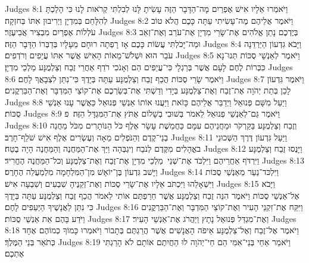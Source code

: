 Judges 8:1	וַיֹּאמְרוּ אֵלָיו אִישׁ אֶפְרַיִם מָה־הַדָּבָר הַזֶּה עָשִׂיתָ לָּנוּ לְבִלְתִּי קְרֹאות לָנוּ כִּי הָלַכְתָּ לְהִלָּחֵם בְּמִדְיָן וַיְרִיבוּן אִתּוֹ בְּחזְקָה׃
Judges 8:2	וַיֹּאמֶר אֲלֵיהֶם מֶה־עָשִׂיתִי עַתָּה כָּכֶם הֲלֹא טוֹב עֹלְלוֹת אֶפְרַיִם מִבְצִיר אֲבִיעֶזֶר׃
Judges 8:3	בְּיֶדְכֶם נָתַן אֱלֹהִים אֶת־שָׂרֵי מִדְיָן אֶת־עֹרֵב וְאֶת־זְאֵב וּמַה־יָּכֹלְתִּי עֲשׂוֹת כָּכֶם אָז רָפְתָה רוּחָם מֵעָלָיו בְּדַבְּרוֹ הַדָּבָר הַזֶּה׃
Judges 8:4	וַיָּבֹא גִדְעוֹן הַיַּרְדֵּנָה עֹבֵר הוּא וּשְׁלֹשׁ־מֵאוֹת הָאִישׁ אֲשֶׁר אִתּוֹ עֲיֵפִים וְרֹדְפִים׃
Judges 8:5	וַיֹּאמֶר לְאַנְשֵׁי סֻכּוֹת תְּנוּ־נָא כִּכְּרוֹת לֶחֶם לָעָם אֲשֶׁר בְּרַגְלָי כִּי־עֲיֵפִים הֵם וְאָנֹכִי רֹדֵף אַחֲרֵי זֶבַח וְצַלְמֻנָּע מַלְכֵי מִדְיָן׃
Judges 8:6	וַיֹּאמֶר שָׂרֵי סֻכּוֹת הֲכַף זֶבַח וְצַלְמֻנָּע עַתָּה בְּיָדֶךָ כִּי־נִתֵּן לִצְבָאֲךָ לָחֶם׃
Judges 8:7	וַיֹּאמֶר גִּדְעוֹן לָכֵן בְּתֵת יְהֹוָה אֶת־זֶבַח וְאֶת־צַלְמֻנָּע בְּיָדִי וְדַשְׁתִּי אֶת־בְּשַׂרְכֶם אֶת־קוֹצֵי הַמִּדְבָּר וְאֶת־הַבַּרְקֳנִים׃
Judges 8:8	וַיַּעַל מִשָּׁם פְּנוּאֵל וַיְדַבֵּר אֲלֵיהֶם כָּזֹאת וַיַּעֲנוּ אוֹתוֹ אַנְשֵׁי פְנוּאֵל כַּאֲשֶׁר עָנוּ אַנְשֵׁי סֻכּוֹת׃
Judges 8:9	וַיֹּאמֶר גַּם־לְאַנְשֵׁי פְנוּאֵל לֵאמֹר בְּשׁוּבִי בְשָׁלוֹם אֶתֹּץ אֶת־הַמִּגְדָּל הַזֶּה׃ {פ}
Judges 8:10	וְזֶבַח וְצַלְמֻנָּע בַּקַּרְקֹר וּמַחֲנֵיהֶם עִמָּם כַּחֲמֵשֶׁת עָשָׂר אֶלֶף כֹּל הַנּוֹתָרִים מִכֹּל מַחֲנֵה בְנֵי־קֶדֶם וְהַנֹּפְלִים מֵאָה וְעֶשְׂרִים אֶלֶף אִישׁ שֹׁלֵף־חָרֶב׃
Judges 8:11	וַיַּעַל גִּדְעוֹן דֶּרֶךְ הַשְּׁכוּנֵי באֳהָלִים מִקֶּדֶם לְנֹבַח וְיגְבְּהָה וַיַּךְ אֶת־הַמַּחֲנֶה וְהַמַּחֲנֶה הָיָה בֶטַח׃
Judges 8:12	וַיָּנֻסוּ זֶבַח וְצַלְמֻנָּע וַיִּרְדֹּף אַחֲרֵיהֶם וַיִּלְכֹּד אֶת־שְׁנֵי  מַלְכֵי מִדְיָן אֶת־זֶבַח וְאֶת־צַלְמֻנָּע וְכל־הַמַּחֲנֶה הֶחֱרִיד׃
Judges 8:13	וַיָּשׁב גִּדְעוֹן בֶּן־יוֹאָשׁ מִן־הַמִּלְחָמָה מִלְמַעֲלֵה הֶחָרֶס׃
Judges 8:14	וַיִּלְכּד־נַעַר מֵאַנְשֵׁי סֻכּוֹת וַיִּשְׁאָלֵהוּ וַיִּכְתֹּב אֵלָיו אֶת־שָׂרֵי סֻכּוֹת וְאֶת־זְקֵנֶיהָ שִׁבְעִים וְשִׁבְעָה אִישׁ׃
Judges 8:15	וַיָּבֹא אֶל־אַנְשֵׁי סֻכּוֹת וַיֹּאמֶר הִנֵּה זֶבַח וְצַלְמֻנָּע אֲשֶׁר חֵרַפְתֶּם אוֹתִי לֵאמֹר הֲכַף זֶבַח וְצַלְמֻנָּע עַתָּה בְּיָדֶךָ כִּי נִתֵּן לַאֲנָשֶׁיךָ הַיְּעֵפִים לָחֶם׃
Judges 8:16	וַיִּקַּח אֶת־זִקְנֵי הָעִיר וְאֶת־קוֹצֵי הַמִּדְבָּר וְאֶת־הַבַּרְקֳנִים וַיֹּדַע בָּהֶם אֵת אַנְשֵׁי סֻכּוֹת׃
Judges 8:17	וְאֶת־מִגְדַּל פְּנוּאֵל נָתָץ וַיַּהֲרֹג אֶת־אַנְשֵׁי הָעִיר׃
Judges 8:18	וַיֹּאמֶר אֶל־זֶבַח וְאֶל־צַלְמֻנָּע אֵיפֹה הָאֲנָשִׁים אֲשֶׁר הֲרַגְתֶּם בְּתָבוֹר וַיֹּאמְרוּ כָּמוֹךָ כְמוֹהֶם אֶחָד כְּתֹאַר בְּנֵי הַמֶּלֶךְ׃
Judges 8:19	וַיֹּאמַר אַחַי בְּנֵי־אִמִּי הֵם חַי־יְהֹוָה לוּ הַחֲיִתֶם אוֹתָם לֹא הָרַגְתִּי אֶתְכֶם׃

